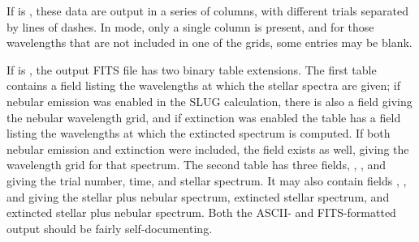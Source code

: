 \documentclass[letterpaper,10pt,english]{sphinxmanual}
\begin{document}
If  is , these data are output in a series of columns, with different trials separated by lines of dashes. In  mode, only a single  column is present, and for those wavelengths that are not included in one of the grids, some entries may be blank.

If  is , the output FITS file has two binary table extensions. The first table contains a field  listing the wavelengths at which the stellar spectra are given; if nebular emission was enabled in the SLUG calculation, there is also a field  giving the nebular wavelength grid, and if extinction was enabled the table has a field  listing the wavelengths at which the extincted spectrum is computed. If both nebular emission and extinction were included, the field  exists as well, giving the wavelength grid for that spectrum. The second table has three fields, , , and  giving the trial number, time, and stellar spectrum. It may also contain fields , , and  giving the stellar plus nebular spectrum, extincted stellar spectrum, and extincted stellar plus nebular spectrum. Both the ASCII- and FITS-formatted output should be fairly self-documenting.
\end{document}
